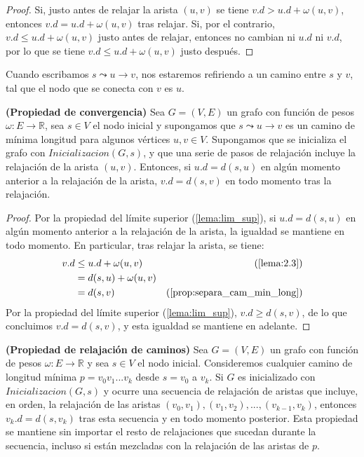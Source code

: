 \begin{proof}
	Si, justo antes de relajar la arista $(u,v)$ se tiene $v.d > u.d + \omega(u,v)$, entonces $v.d = u.d + \omega(u,v)$ tras relajar. Si, por el contrario, $v.d\leq u.d + \omega(u,v)$ justo antes de relajar, entonces no cambian ni $u.d$ ni $v.d$, por lo que se tiene $v.d\leq u.d + \omega(u,v)$ justo después.
\end{proof}

\begin{observacion}
	Cuando escribamos $s \leadsto u \rightarrow v$, nos estaremos refiriendo a un camino entre $s$ y $v$, tal que el nodo que se conecta con $v$ es $u$.
\end{observacion}

\begin{lema}\label{lema:convergencia}
	\textbf{(Propiedad de convergencia)} Sea $G=(V,E)$ un grafo con función de pesos $\omega : E\rightarrow \mathbb{R}$, sea $s\in V$ el nodo inicial y supongamos que $s \leadsto u \rightarrow v$ es un camino de mínima longitud para algunos vértices $u,v\in V$. Supongamos que se inicializa el grafo con $Inicializacion(G,s)$, y que una serie de pasos de relajación incluye la relajación de la arista $(u,v)$. Entonces, si $u.d=d(s,u)$ en algún momento anterior a la relajación de la arista, $v.d=d(s,v)$ en todo momento tras la relajación.
\end{lema}

\begin{proof}
	Por la propiedad del límite superior (\autoref{lema:lim_sup}), si $u.d=d(s,u)$ en algún momento anterior a la relajación de la arista, la igualdad se mantiene en todo momento. En particular, tras relajar la arista, se tiene:
	\begin{align*}
			v.d & \leq u.d + \omega(u,v) & (\textrm{\autoref{lema:2.3}}) \\
			& = d(s,u) + \omega(u,v) \\
			& = d(s,v) &(\textrm{\autoref{prop:separa_cam_min_long}})
	\end{align*}
	Por la propiedad del límite superior (\autoref{lema:lim_sup}), $v.d\geq d(s,v)$, de lo que concluimos $v.d = d(s,v)$, y esta igualdad se mantiene en adelante.
\end{proof}

\begin{lema}\label{lema:relaj_caminos}
	\textbf{(Propiedad de relajación de caminos)} Sea $G=(V,E)$ un grafo con función de pesos $\omega : E\rightarrow \mathbb{R}$ y sea $s\in V$ el nodo inicial. Consideremos cualquier camino de longitud mínima $p = v_0v_1...v_k$ desde $s=v_0$ a $v_k$. Si $G$ es inicializado con $Inicializacion(G,s)$ y ocurre una secuencia de relajación de aristas que incluye, en orden, la relajación de las aristas $(v_0,v_1),(v_1,v_2),...,(v_{k-1},v_k)$, entonces $v_k.d=d(s,v_k)$ tras esta secuencia y en todo momento posterior. Esta propiedad se mantiene sin importar el resto de relajaciones que sucedan durante la secuencia, incluso si están mezcladas con la relajación de las aristas de $p$.
\end{lema}


